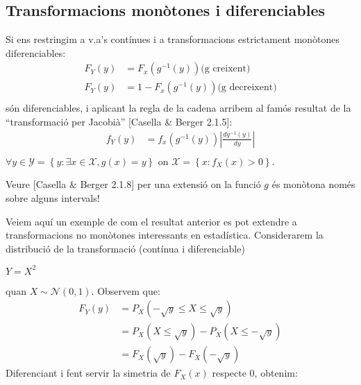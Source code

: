 \documentclass[letterpaper,10pt,english]{sphinxmanual}
\begin{document}
\subsection{Transformacions monòtones i diferenciables}
\label{\detokenize{0_Intro/0_1_Repas_probabilitat:transformacions-monotones-i-diferenciables}}
Si ens restringim a v.a’s contínues i a transformacions estrictament monòtones diferenciables:
\begin{equation*}
\begin{split}F_Y\left(y\right) &= F_x\left(g^{-1}\left(y\right)\right) \mbox{(g creixent)} \\
F_Y\left(y\right) &= 1 - F_x\left(g^{-1}\left(y\right)\right) \mbox{(g decreixent)}\\\end{split}
\end{equation*}
són diferenciables, i aplicant la regla de la cadena arribem al famós resultat de la “transformació per Jacobià” {[}Casella \& Berger 2.1.5{]}:
\begin{equation*}
\begin{split}f_Y\left(y\right) &= f_x\left(g^{-1}\left(y\right)\right)\left|\frac{d g^{-1}\left(y\right)}{dy} \right| \\\end{split}
\end{equation*}
\(\forall y \in \mathcal{Y} = \left\{y : \exists x\in \mathcal{X},  g(x)=y \right\}\)
on \(\mathcal{X} = \left\{x : f_X\left(x\right) > 0 \right\}\).

Veure {[}Casella \& Berger 2.1.8{]} per una extensió on la funció \(g\) és monòtona només sobre alguns intervals!

Veiem aquí un exemple de com el resultat anterior es pot extendre a transformacions
no monòtones interessants en estadística. Considerarem la distribució de la transformació (contínua i diferenciable)

\(Y = X^2\)

quan \(X \sim \mathcal{N}\left(0, 1\right)\). Observem que:
\begin{equation*}
\begin{split}F_Y\left(y\right) &= P_X\left(-\sqrt{y} \leq X \leq \sqrt{y}\right) \\
                  &= P_X\left(X \leq \sqrt{y}\right) - P_X\left(X \leq -\sqrt{y}\right) \\
                  &= F_X\left(\sqrt{y}\right) - F_X\left(-\sqrt{y}\right)\end{split}
\end{equation*}
Diferenciant i fent servir la simetria de \(F_X\left(x\right)\) respecte 0, obtenim:
\end{document}
